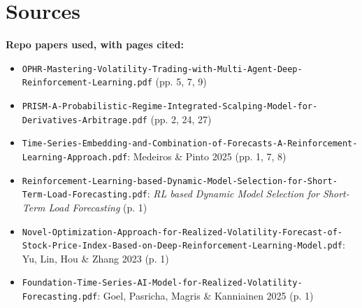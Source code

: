 \documentclass{article}
\begin{document}
\section{Sources}

\textbf{Repo papers used, with pages cited:}

\begin{itemize}

\item \texttt{OPHR-\allowbreak{}Mastering-\allowbreak{}Volatility-\allowbreak{}Trading-\allowbreak{}with-\allowbreak{}Multi-\allowbreak{}Agent-\allowbreak{}Deep-\allowbreak{}Reinforcement-\allowbreak{}Learning.\allowbreak{}pdf} (pp. 5, 7, 9)

\item \texttt{PRISM-\allowbreak{}A-\allowbreak{}Probabilistic-\allowbreak{}Regime-\allowbreak{}Integrated-\allowbreak{}Scalping-\allowbreak{}Model-\allowbreak{}for-\allowbreak{}Derivatives-\allowbreak{}Arbitrage.\allowbreak{}pdf} (pp. 2, 24, 27)

\item \texttt{Time-\allowbreak{}Series-\allowbreak{}Embedding-\allowbreak{}and-\allowbreak{}Combination-\allowbreak{}of-\allowbreak{}Forecasts-\allowbreak{}A-\allowbreak{}Reinforcement-\allowbreak{}Learning-\allowbreak{}Approach.\allowbreak{}pdf}: Medeiros \& Pinto 2025 (pp. 1, 7, 8)

\item \texttt{Reinforcement-\allowbreak{}Learning-\allowbreak{}based-\allowbreak{}Dynamic-\allowbreak{}Model-\allowbreak{}Selection-\allowbreak{}for-\allowbreak{}Short-\allowbreak{}Term-\allowbreak{}Load-\allowbreak{}Forecasting.\allowbreak{}pdf}: \emph{RL based Dynamic Model Selection for Short-Term Load Forecasting} (p. 1)

\item \texttt{Novel-\allowbreak{}Optimization-\allowbreak{}Approach-\allowbreak{}for-\allowbreak{}Realized-\allowbreak{}Volatility-\allowbreak{}Forecast-\allowbreak{}of-\allowbreak{}Stock-\allowbreak{}Price-\allowbreak{}Index-\allowbreak{}Based-\allowbreak{}on-\allowbreak{}Deep-\allowbreak{}Reinforcement-\allowbreak{}Learning-\allowbreak{}Model.\allowbreak{}pdf}: Yu, Lin, Hou \& Zhang 2023 (p. 1)

\item \texttt{Foundation-\allowbreak{}Time-\allowbreak{}Series-\allowbreak{}AI-\allowbreak{}Model-\allowbreak{}for-\allowbreak{}Realized-\allowbreak{}Volatility-\allowbreak{}Forecasting.\allowbreak{}pdf}: Goel, Pasricha, Magris \& Kanniainen 2025 (p. 1)


\end{itemize}
\end{document}
